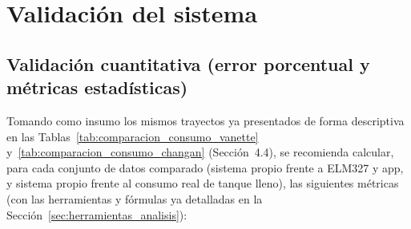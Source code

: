 \section{Validación del sistema}
\label{sec:validacion_cuantitativa}

\subsection{Validación cuantitativa (error porcentual y métricas estadísticas)}

Tomando como insumo los mismos trayectos ya presentados de forma descriptiva en las Tablas~\ref{tab:comparacion_consumo_vanette} y~\ref{tab:comparacion_consumo_changan} (Sección~4.4), se recomienda calcular, para cada conjunto de datos comparado (sistema propio frente a ELM327 y app, y sistema propio frente al consumo real de tanque lleno), las siguientes métricas (con las herramientas y fórmulas ya detalladas en la Sección~\ref{sec:herramientas_analisis}):

